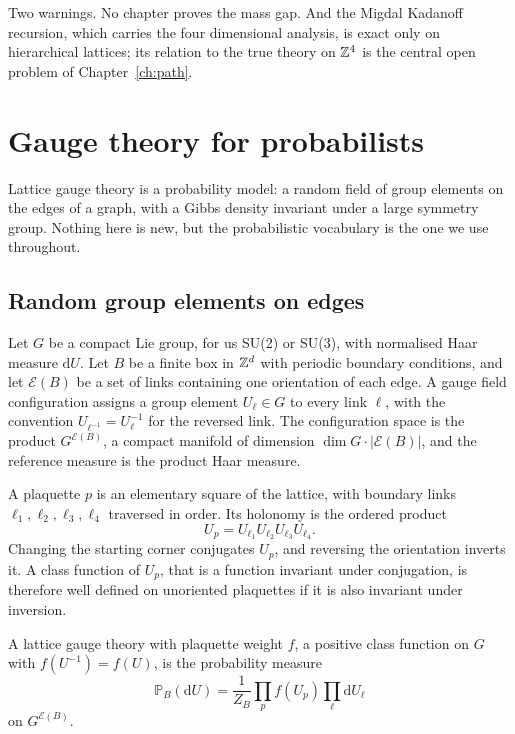 Two warnings. No chapter proves the mass gap. And the Migdal Kadanoff recursion, which carries the four dimensional analysis, is exact only on hierarchical lattices; its relation to the true theory on $\mathbb{Z}^4$ is the central open problem of Chapter~\ref{ch:path}.

\section{Gauge theory for probabilists}\label{ch:gauge}

Lattice gauge theory is a probability model: a random field of group elements on the edges of a graph, with a Gibbs density invariant under a large symmetry group. Nothing here is new, but the probabilistic vocabulary is the one we use throughout.

\subsection{Random group elements on edges}

Let $G$ be a compact Lie group, for us SU(2) or SU(3), with normalised Haar measure $\mathrm dU$. Let $B$ be a finite box in $\mathbb{Z}^d$ with periodic boundary conditions, and let $\mathcal E(B)$ be a set of links containing one orientation of each edge. A gauge field configuration assigns a group element $U_\ell\in G$ to every link $\ell$, with the convention $U_{\ell^{-1}}=U_\ell^{-1}$ for the reversed link. The configuration space is the product $G^{\mathcal E(B)}$, a compact manifold of dimension $\dim G\cdot|\mathcal E(B)|$, and the reference measure is the product Haar measure.

A plaquette $p$ is an elementary square of the lattice, with boundary links $\ell_1,\ell_2,\ell_3,\ell_4$ traversed in order. Its holonomy is the ordered product
\[
U_p=U_{\ell_1}U_{\ell_2}U_{\ell_3}U_{\ell_4}.
\]
Changing the starting corner conjugates $U_p$, and reversing the orientation inverts it. A class function of $U_p$, that is a function invariant under conjugation, is therefore well defined on unoriented plaquettes if it is also invariant under inversion.

\begin{definition}
A lattice gauge theory with plaquette weight $f$, a positive class function on $G$ with $f(U^{-1})=f(U)$, is the probability measure
\[
\mathbb P_B(\mathrm dU)=\frac{1}{Z_B}\prod_pf(U_p)\prod_\ell\mathrm dU_\ell
\]
on $G^{\mathcal E(B)}$.
\end{definition}

